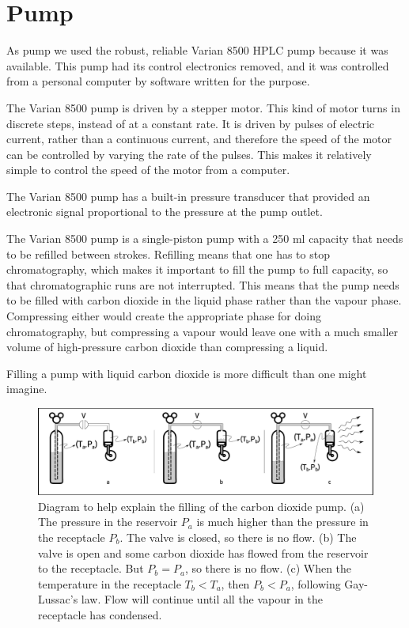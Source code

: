 \section{Pump}
\label{sec:CO2Pump}

As pump we used the robust, reliable Varian 8500 HPLC pump because it was
available. This pump had its control electronics removed, and it was controlled
from a personal computer by software written for the purpose.

The Varian 8500 pump is driven by a stepper motor. This kind of motor turns in
discrete steps, instead of at a constant rate. It is driven by pulses of
electric current, rather than a continuous current, and therefore the speed of
the motor can be controlled by varying the rate of the pulses. This makes it
relatively simple to control the speed of the motor from a computer.

The Varian 8500 pump has a built-in pressure transducer that provided an
electronic signal proportional to the pressure at the pump outlet.

The Varian 8500 pump is a single-piston pump with a 250 \si{\milli\litre} capacity that
needs to be refilled between strokes. Refilling means that one has to stop
chromatography, which makes it important to fill the pump to full capacity, so
that chromatographic runs are not interrupted. This means that the pump needs to
be filled with carbon dioxide in the liquid phase rather than the vapour phase.
Compressing either would create the appropriate phase for doing chromatography,
but compressing a vapour would leave one with a much smaller volume of
high-pressure carbon dioxide than compressing a liquid.

Filling a pump with liquid carbon dioxide is more difficult than one might
imagine. 


\begin{figure}
\centering
\includegraphics[width=\textwidth]{Figures/CO2Filling.pdf}
\decoRule

\caption[Fillng a CO\textsubscript{2} pump.]{Diagram to help explain the filling of
the carbon dioxide pump. (a) The pressure in the reservoir $P_a$ is much higher
than the pressure in the receptacle $P_b$. The valve is closed, so there is no
flow. (b) The valve is open and some carbon dioxide has flowed from the
reservoir to the receptacle. But $P_b = P_a$, so there is no flow. (c) When the
temperature in the receptacle $T_b < T_a$, then $P_b  < P_a$, following
Gay-Lussac's law. Flow will continue until all the vapour in the receptacle has
condensed.}

\label{fig:co2fill}
\end{figure}


